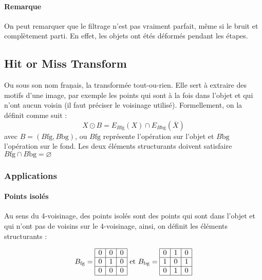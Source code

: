 \documentclass[10pt,a4paper]{article}
\begin{document}
\paragraph{Remarque} On peut remarquer que le filtrage n'est pas vraiment parfait, m\^{e}me si le bruit et compl\`{e}tement parti. En effet, les objets ont \'{e}t\'{e}s déform\'{e}s pendant les \'{e}tapes.

\clearpage


\subsection{Hit or Miss Transform}

Ou sous son nom fran\c{}ais, la transform\'{e}e tout-ou-rien. Elle sert \`{a} extraire des motifs d'une image, par exemple les points qui sont \`{a} la fois dans l'objet et qui n'ont aucun voisin (il faut pr\'{e}ciser le voisinage utilis\'{e}). Formellement, on la d\'{e}finit comme suit : 
\begin{displaymath}
	X\odot B = E_{B{\text{fg}}}\left(X\right) \cap E_{B{\text{bg}}}\left(\overline{X}\right)
\end{displaymath}
avec $B = \left(B{\text{fg}},B{\text{bg}}\right)$, ou $B{\text{fg}}$ repr\'{e}sente l'op\'{e}ration sur l'objet et $B{\text{bg}}$ l'op\'{e}ration sur le fond. Les deux \'{e}l\'{e}ments structurants doivent satisfaire $B{\text{fg}}\cap B{\text{bg}} = \varnothing$

\subsubsection{Applications}

\paragraph{Points isol\'{e}s}
Au sens du 4-voisinage, des points isol\'{e}s sont des points qui sont dans l’objet et qui n'ont pas de voisins sur le 4-voisinage, ainsi, on d\'{e}finit les \'{e}l\'{e}ments structurants : 


\begin{displaymath}
B_{\text{fg}} = 
\begin{array}{|c|c|c|}
	\hline 0  & 0  & 0   \\
	\hline 0  & 1  & 0  \\
	\hline 0  & 0  & 0  \\
	\hline
\end{array}
\text{ et } 
B_{\text{bg}} = 
	\begin{array}{|c|c|c|}
	 \hline 0  & 1  & 0   \\
	 \hline 1  & 0  & 1  \\
	 \hline 0  & 1  & 0  \\
	\hline
	\end{array}
\end{displaymath}
\end{document}

